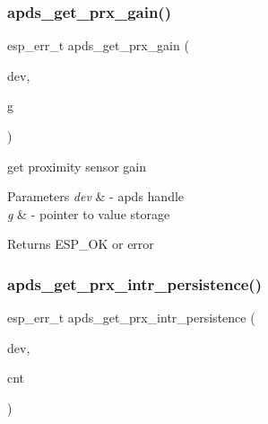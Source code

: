 \subsubsection{\texorpdfstring{apds\+\_\+get\+\_\+prx\+\_\+gain()}{apds\_get\_prx\_gain()}}
{\footnotesize\ttfamily esp\+\_\+err\+\_\+t apds\+\_\+get\+\_\+prx\+\_\+gain (\begin{DoxyParamCaption}\item[{\hyperlink{structAPDS9960__Driver}{A\+P\+D\+S\+\_\+\+D\+EV}}]{dev,  }\item[{gst\+\_\+gain\+\_\+t $\ast$}]{g }\end{DoxyParamCaption})}




\begin{DoxyItemize}
\item get proximity sensor gain 
\end{DoxyItemize}


\begin{DoxyParams}{Parameters}
{\em dev} & -\/ apds handle \\
\hline
{\em g} & -\/ pointer to value storage \\
\hline
\end{DoxyParams}
\begin{DoxyReturn}{Returns}
E\+S\+P\+\_\+\+OK or error 
\end{DoxyReturn}
\mbox{\label{group__APDS9960__ProximityFunctions_ga4cb65518df4268820b5bec80fd0a1d6d}} 
\subsubsection{\texorpdfstring{apds\+\_\+get\+\_\+prx\+\_\+intr\+\_\+persistence()}{apds\_get\_prx\_intr\_persistence()}}
{\footnotesize\ttfamily esp\+\_\+err\+\_\+t apds\+\_\+get\+\_\+prx\+\_\+intr\+\_\+persistence (\begin{DoxyParamCaption}\item[{\hyperlink{structAPDS9960__Driver}{A\+P\+D\+S\+\_\+\+D\+EV}}]{dev,  }\item[{\hyperlink{vl53l0x__types_8h_aba7bc1797add20fe3efdf37ced1182c5}{uint8\+\_\+t} $\ast$}]{cnt }\end{DoxyParamCaption})}




